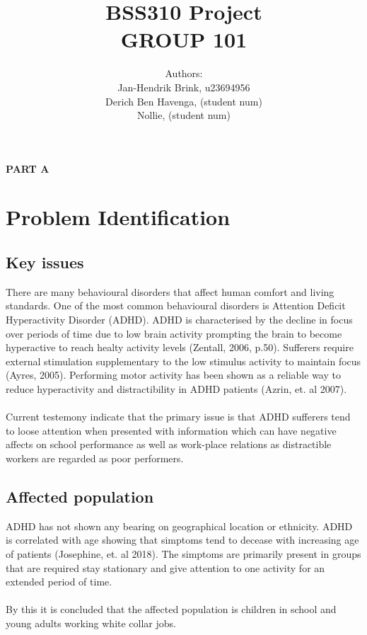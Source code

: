 \documentclass{article}
\title{
  BSS310 Project \\
  GROUP 101 \\
}
\author{Authors:\\Jan-Hendrik Brink, u23694956
                \\Derich Ben Havenga, (student num)
                \\Nollie, (student num) }
\begin{document}
 
  \Huge \maketitle
  \huge \makeatletter
  \@title 
  \makeatother


  \newpage{}
  \huge{\bfseries{PART A}}
  \large 
  \section{Problem Identification}
    \subsection{Key issues}
      There are many behavioural disorders that affect human comfort and living
      standards. One of the most common behavioural disorders is 
      Attention Deficit Hyperactivity Disorder (ADHD). ADHD is characterised by 
      the decline in focus over periods of time due to low  brain activity
      prompting the brain to become hyperactive to reach healty activity 
      levels (Zentall, 2006, p.50). Sufferers require external stimulation 
      supplementary to the low stimulus activity to maintain focus
      (Ayres, 2005). Performing motor activity has been shown as a reliable way
      to reduce hyperactivity and distractibility in ADHD patients 
      (Azrin, et. al 2007).\\ \\
      Current testemony indicate that the primary issue is that ADHD sufferers
      tend to loose attention when presented with information which can have
      negative affects on school performance as well as work-place relations
      as distractible workers are regarded as poor performers.

    \subsection{Affected population}
      ADHD has not shown any bearing on geographical location or ethnicity.
      ADHD is correlated with age showing that simptoms tend to decease with
      increasing age of patients (Josephine, et. al 2018). The simptoms are 
      primarily present in groups that are required stay stationary and give
      attention to one activity for an extended period of time. \\ \\
      By this it is concluded that the affected population is children in 
      school and young adults working white collar jobs.
\end{document}
